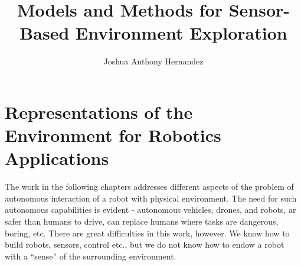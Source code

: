 \documentclass [PhD] {uclathes}
\title          {Models and Methods for Sensor-Based Environment Exploration
}
\author         {Joshua Anthony Hernandez}
\begin{document}
\makeintropages

%
%
\graphicspath{{Exploration/IDE/}{Exploration/Model/}{Exploration/Implementation/}{Exploration/Horizon/}{Exploration/Suff_Explor/}{Exploration/Eval/}{Exploration/Speedup/}{Exploration/Statistics/}{MinRep/}{SolidObjects/cvpr2014_solobj/}}
\chapter{Representations of the Environment for Robotics Applications}
The work in the following chapters addresses different aspects of the problem of autonomous interaction of a robot with physical environment.
The need for such autonomous capabilities is evident - autonomous vehicles, drones,  and robots, ar safer than  humans to drive, can replace humans where tasks are dangerous, boring, etc.
There are great difficulties in this work, however. We know how to build robots, sensors, control etc., 
but we do not know how to endow a robot with a ``sense'' of the surrounding environment. 
\iffalse
\end{document}
